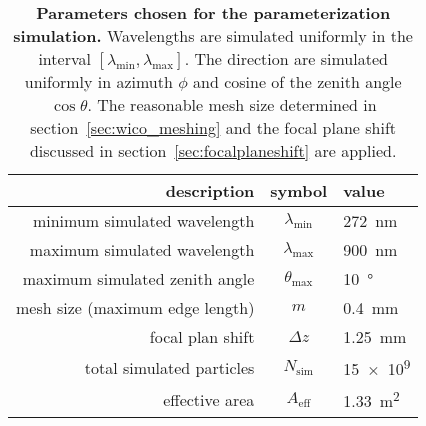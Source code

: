 \begin{table}[H]
	\centering
	\begin{tabular}{r|c|l}
		\toprule
		description 				   & symbol               & value\\
		\midrule
		minimum simulated wavelength   & $\lambda_\text{min}$ & \SI{272}{\nano\meter}\\
		maximum simulated wavelength   & $\lambda_\text{max}$ & \SI{900}{\nano\meter}\\
		maximum simulated zenith angle & $\theta_\text{max}$  & \SI{10}{\degree}\\
		mesh size (maximum edge length)& $m$				  & \SI{0.4}{\milli\meter}\\
		focal plan shift 			   & $\Delta z$			  & \SI{1.25}{\milli\meter}\\
		total simulated particles      & $N_\text{sim}$		  & \num{15e9}\\
		effective area				   & $A_\text{eff}$		  & \SI{1.33}{\meter\squared}\\
		\bottomrule
	\end{tabular}
	\caption[Parameterization simulation parameters]{\textbf{Parameters chosen for the parameterization simulation.} Wavelengths are simulated uniformly in the interval $[\lambda_\text{min}, \lambda_\text{max}]$. The direction are simulated uniformly in azimuth $\phi$ and cosine of the zenith angle $\cos{\theta}$. The reasonable mesh size determined in section~\ref{sec:wico_meshing} and the focal plane shift discussed in section~\ref{sec:focalplaneshift} are applied.}
	\label{paramsim:params}
\end{table}